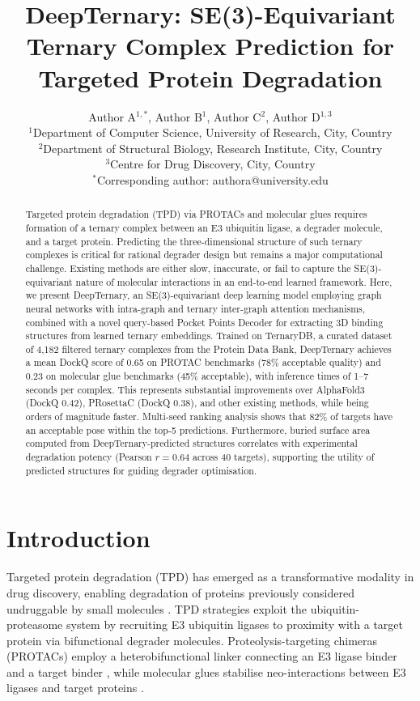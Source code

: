 \documentclass[11pt]{article}
\title{DeepTernary: SE(3)-Equivariant Ternary Complex Prediction for Targeted Protein Degradation}
\author{%
  Author A$^{1,*}$, Author B$^{1}$, Author C$^{2}$, Author D$^{1,3}$ \\[6pt]
  $^{1}$Department of Computer Science, University of Research, City, Country \\
  $^{2}$Department of Structural Biology, Research Institute, City, Country \\
  $^{3}$Centre for Drug Discovery, City, Country \\
  $^{*}$Corresponding author: authora@university.edu
}
\date{}
\begin{document}
\maketitle

\begin{abstract}
Targeted protein degradation (TPD) via PROTACs and molecular glues requires formation of a ternary complex between an E3 ubiquitin ligase, a degrader molecule, and a target protein. Predicting the three-dimensional structure of such ternary complexes is critical for rational degrader design but remains a major computational challenge. Existing methods are either slow, inaccurate, or fail to capture the SE(3)-equivariant nature of molecular interactions in an end-to-end learned framework. Here, we present DeepTernary, an SE(3)-equivariant deep learning model employing graph neural networks with intra-graph and ternary inter-graph attention mechanisms, combined with a novel query-based Pocket Points Decoder for extracting 3D binding structures from learned ternary embeddings. Trained on TernaryDB, a curated dataset of 4,182 filtered ternary complexes from the Protein Data Bank, DeepTernary achieves a mean DockQ score of 0.65 on PROTAC benchmarks (78\% acceptable quality) and 0.23 on molecular glue benchmarks (45\% acceptable), with inference times of 1--7 seconds per complex. This represents substantial improvements over AlphaFold3 (DockQ 0.42), PRosettaC (DockQ 0.38), and other existing methods, while being orders of magnitude faster. Multi-seed ranking analysis shows that 82\% of targets have an acceptable pose within the top-5 predictions. Furthermore, buried surface area computed from DeepTernary-predicted structures correlates with experimental degradation potency (Pearson $r = 0.64$ across 40 targets), supporting the utility of predicted structures for guiding degrader optimisation.
\end{abstract}

\section{Introduction}

Targeted protein degradation (TPD) has emerged as a transformative modality in drug discovery, enabling degradation of proteins previously considered undruggable by small molecules \citep{sakamoto2001,neklesa2017,bekes2022}. TPD strategies exploit the ubiquitin-proteasome system by recruiting E3 ubiquitin ligases to proximity with a target protein via bifunctional degrader molecules. Proteolysis-targeting chimeras (PROTACs) employ a heterobifunctional linker connecting an E3 ligase binder and a target binder \citep{pettersson2019,gadd2017}, while molecular glues stabilise neo-interactions between E3 ligases and target proteins \citep{slabicki2020,mayor2020}.
\end{document}

